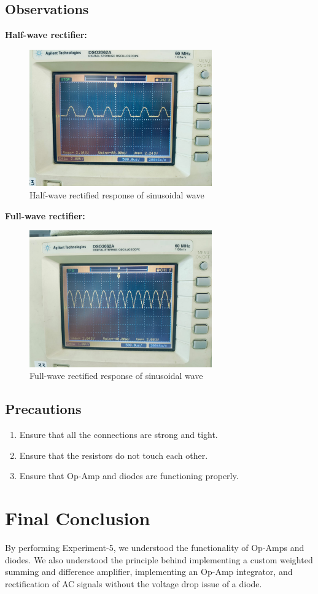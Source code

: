\documentclass[a4paper,12pt]{article}
\begin{document}
\subsection{Observations}
\textbf{Half-wave rectifier:}
\begin{figure}[H]
    \centering
    \includegraphics[width=0.7\textwidth]{fig/h.jpeg} %
    \caption{Half-wave rectified response of sinusoidal wave}
\end{figure}
\textbf{Full-wave rectifier:}
\begin{figure}[H]
    \centering
    \includegraphics[width=0.7\textwidth]{fig/f.jpeg} %
    \caption{Full-wave rectified response of sinusoidal wave}
\end{figure}
\subsection{Precautions}
\begin{enumerate}
    \item Ensure that all the connections are strong and tight.
    \item Ensure that the resistors do not touch each other.
    \item Ensure that Op-Amp and diodes are functioning properly.
\end{enumerate}

\section{Final Conclusion}
By performing Experiment-5, we understood the functionality of Op-Amps and diodes. We also understood the principle behind implementing a custom weighted summing and difference amplifier, implementing an Op-Amp integrator, and rectification of AC signals without the voltage drop issue of a diode.
\end{document}
